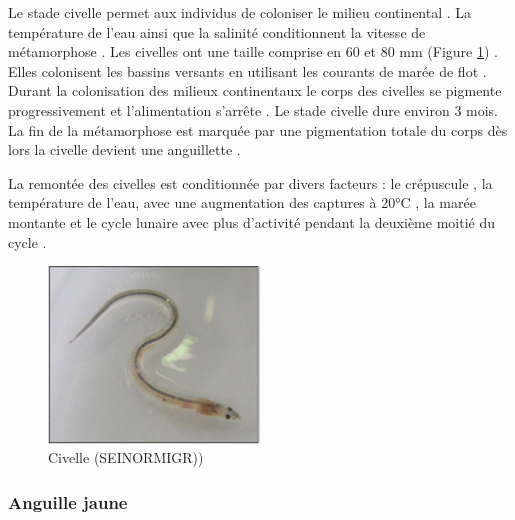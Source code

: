 \documentclass[11pt,titlepage,twoside]{article}\usepackage[]{graphicx}\usepackage[table]{xcolor}
\begin{document}
Le stade civelle permet aux individus de coloniser le milieu continental \citep{edeline_role_2005}. La température de l’eau ainsi que la salinité conditionnent la vitesse de métamorphose \citep{laffaille_point_2005}. Les civelles ont une taille comprise en 60 et 80 mm (Figure \ref{civelle}) \citep{adam_anguille_2008-1}.  Elles colonisent les bassins versants en utilisant les courants de marée de flot \citep{hirschinger_donnees_2015}. Durant la colonisation des milieux continentaux le corps des civelles se pigmente progressivement \citep{prouzet_etude_2003} et l’alimentation s’arrête \citep{prouzet_historique_2002} . Le stade civelle dure environ 3 mois. La fin de la métamorphose est marquée par une pigmentation totale du corps dès lors la civelle devient une anguillette \citep{laffaille_role_2000}.

La remontée des civelles est conditionnée par divers facteurs : le crépuscule \citep{bardonnet_influence_2003, bardonnet_etude_2005}, la température de l’eau, avec une augmentation des captures à 20°C \citep{white_environmental_1997}, la marée montante \citep{bardonnet_influence_2003} et le cycle lunaire avec plus d’activité pendant la deuxième moitié du cycle \citep{todd_timing_1981}. 

\begin{figure}[htpb]
\centering
\includegraphics[width=0.5\textwidth]{civelle}
\caption{Civelle (SEINORMIGR))}
\label{civelle}
\end{figure}

\subsubsection{Anguille jaune }
\end{document}
